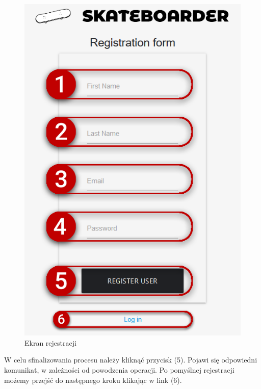 \documentclass[12pt,a4paper,titlepage]{article}
\begin{document}
\begin{figure}[H]
    \centering
    \includegraphics[scale=.47]{Pics/registration.png}
    \caption{Ekran rejestracji}
    \label{pic:registration}
\end{figure}
W celu sfinalizowania procesu należy kliknąć przycisk (5). Pojawi się odpowiedni komunikat, w zależności od powodzenia operacji. Po pomyślnej rejestracji możemy przejść do następnego kroku klikając w link (6).
\end{document}
